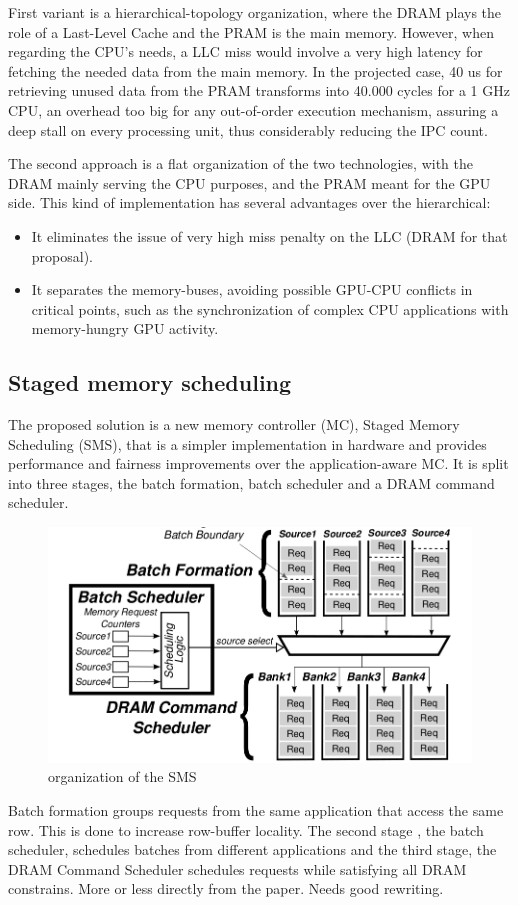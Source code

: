 \documentclass[12pt,journal,compsoc]{IEEEtran}
\begin{document}
First variant is a hierarchical-topology organization, where the DRAM plays the role of a Last-Level Cache and the PRAM is the main memory. However, when regarding the CPU’s needs, a LLC miss would involve a very high latency for fetching the needed data from the main memory. In the projected case, 40 us for retrieving unused data from the PRAM transforms into 40.000 cycles for a 1 GHz CPU, an overhead too big for any out-of-order execution mechanism, assuring a deep stall on every processing unit, thus considerably reducing the IPC count.

The second approach is a flat organization of the two technologies, with the DRAM mainly serving the CPU purposes, and the PRAM meant for the GPU side. This kind of implementation has several advantages over the hierarchical:
\begin{itemize}
\item
It eliminates the issue of very high miss penalty on the LLC (DRAM for that proposal).
\item
It separates the memory-buses, avoiding possible GPU-CPU conflicts in critical points, such as the synchronization of complex CPU applications with memory-hungry GPU activity.
\end{itemize}


\subsection{Staged memory scheduling}
The proposed solution is a new memory controller (MC), Staged Memory Scheduling (SMS),  that is a simpler implementation in hardware and provides performance and fairness improvements over the application-aware MC.  It is split into three stages, the batch formation, batch scheduler and a DRAM command scheduler.

\begin{figure}[H]
	\centering
	\includegraphics[width = 8 cm]{graphics/SmS.png}
	\caption{organization of the SMS \cite{SmS}}
\end{figure}

Batch formation groups requests from the same application that access the same row.  This is done to increase row-buffer locality.  The second stage , the batch scheduler, schedules batches from different applications and the third stage, the DRAM Command Scheduler schedules requests while satisfying all DRAM constrains. More or less directly from the paper.  Needs good rewriting. 
\end{document}

